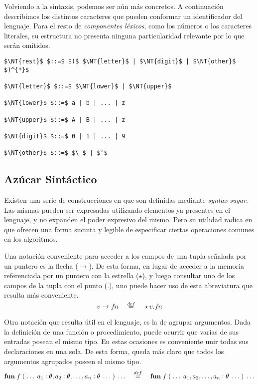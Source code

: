 Volviendo a la sintaxis, podemos ser aún más concretos.
A continuación describimos los distintos caracteres que pueden conformar un identificador del lenguaje.
Para el resto de \textit{componentes léxicos}, como los números o los caracteres literales, su estructura no presenta ninguna particularidad relevante por lo que serán omitidos.

\begin{lstlisting}[style = syntax]
$\NT{rest}$ $::=$ $($ $\NT{letter}$ | $\NT{digit}$ | $\NT{other}$ $)^{*}$

$\NT{letter}$ $::=$ $\NT{lower}$ | $\NT{upper}$

$\NT{lower}$ $::=$ a | b | ... | z

$\NT{upper}$ $::=$ A | B | ... | z

$\NT{digit}$ $::=$ 0 | 1 | ... | 9

$\NT{other}$ $::=$ $\_$ | $'$
\end{lstlisting}

\subsection{Azúcar Sintáctico}

Existen una serie de construcciones en \Lenguaje{} que son definidas mediante \textit{syntax sugar}.
Las mismas pueden ser expresadas utilizando elementos ya presentes en el lenguaje, y no expanden el poder expresivo del mismo.
Pero su utilidad radica en que ofrecen una forma sucinta y legible de especificar ciertas operaciones comunes en los algoritmos.

Una notación conveniente para acceder a los campos de una tupla señalada por un puntero es la flecha ($\rightarrow$).
De esta forma, en lugar de acceder a la memoria referenciada por un puntero con la estrella ($\star$), y luego consultar uno de los campos de la tupla con el punto ($.$), uno puede hacer uso de esta abreviatura que resulta más conveniente.
\begin{gather*}
v \rightarrow fn
\quad
\overset{def}{=}
\quad
\star v . fn
\end{gather*}

Otra notación que resulta útil en el lenguaje, es la de agrupar argumentos.
Dada la definición de una función o procedimiento, puede ocurrir que varias de sus entradas posean el mismo tipo.
En estas ocasiones es conveniente unir todas sus declaraciones en una sola.
De esta forma, queda más claro que todos los argumentos agrupados poseen el mismo tipo.
\begin{gather*}
\mathbf{fun} \; f \; ( \; \ldots \; a_1 : \theta, a_2 : \theta, \ldots, a_n : \theta \; \ldots \; ) \; \ldots
\quad
\overset{def}{=}
\quad
\mathbf{fun} \; f \; ( \; \ldots \; a_1, a_2, \ldots, a_n : \theta \; \ldots \; ) \; \ldots
\end{gather*}

